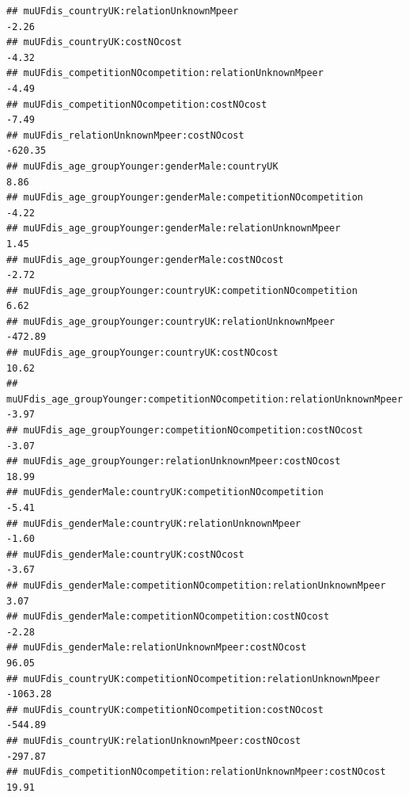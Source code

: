 \documentclass[
]{article}
\begin{document}
\begin{verbatim}
## muUFdis_countryUK:relationUnknownMpeer                                                          -2.26
## muUFdis_countryUK:costNOcost                                                                    -4.32
## muUFdis_competitionNOcompetition:relationUnknownMpeer                                           -4.49
## muUFdis_competitionNOcompetition:costNOcost                                                     -7.49
## muUFdis_relationUnknownMpeer:costNOcost                                                       -620.35
## muUFdis_age_groupYounger:genderMale:countryUK                                                    8.86
## muUFdis_age_groupYounger:genderMale:competitionNOcompetition                                    -4.22
## muUFdis_age_groupYounger:genderMale:relationUnknownMpeer                                         1.45
## muUFdis_age_groupYounger:genderMale:costNOcost                                                  -2.72
## muUFdis_age_groupYounger:countryUK:competitionNOcompetition                                      6.62
## muUFdis_age_groupYounger:countryUK:relationUnknownMpeer                                       -472.89
## muUFdis_age_groupYounger:countryUK:costNOcost                                                   10.62
## muUFdis_age_groupYounger:competitionNOcompetition:relationUnknownMpeer                          -3.97
## muUFdis_age_groupYounger:competitionNOcompetition:costNOcost                                    -3.07
## muUFdis_age_groupYounger:relationUnknownMpeer:costNOcost                                        18.99
## muUFdis_genderMale:countryUK:competitionNOcompetition                                           -5.41
## muUFdis_genderMale:countryUK:relationUnknownMpeer                                               -1.60
## muUFdis_genderMale:countryUK:costNOcost                                                         -3.67
## muUFdis_genderMale:competitionNOcompetition:relationUnknownMpeer                                 3.07
## muUFdis_genderMale:competitionNOcompetition:costNOcost                                          -2.28
## muUFdis_genderMale:relationUnknownMpeer:costNOcost                                              96.05
## muUFdis_countryUK:competitionNOcompetition:relationUnknownMpeer                              -1063.28
## muUFdis_countryUK:competitionNOcompetition:costNOcost                                         -544.89
## muUFdis_countryUK:relationUnknownMpeer:costNOcost                                             -297.87
## muUFdis_competitionNOcompetition:relationUnknownMpeer:costNOcost                                19.91

\end{verbatim}
\end{document}
